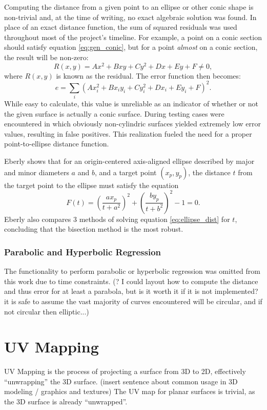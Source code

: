 Computing the distance from a given point to an ellipse or other conic shape is non-trivial and, at the time of writing, no exact algebraic solution was found.
In place of an exact distance function, the sum of squared residuals was used throughout most of the project's timeline.
For example, a point on a conic section should satisfy equation \ref{eq:gen_conic}, but for a point \textit{almost} on a conic section, the result will be non-zero:
\begin{equation}
	R(x,y) = Ax^2 + Bxy + Cy^2 + Dx + Ey + F \neq 0,
\end{equation}
where $R(x,y)$ is known as the residual. The error function then becomes:
\begin{equation}
	e = \sum_i \left(Ax_i^2 + Bx_i y_i + Cy_i^2 + Dx_i + Ey_i + F\right)^2.
\end{equation}
While easy to calculate, this value is unreliable as an indicator of whether or not the given surface is actually a conic surface.
During testing cases were encountered in which obviously non-cylindric surfaces yielded extremely low error values, resulting in false positives.
This realization fueled the need for a proper point-to-ellipse distance function.

Eberly\cite{GeoTools_pt_to_ellipse} shows that for an origin-centered axis-aligned ellipse described by major and minor diameters $a$ and $b$, and a target point $(x_p, y_p)$, the distance $t$ from the target point to the ellipse must satisfy the equation
\begin{equation}\label{eq:ellipse_dist}
	F(t) = \left(\frac{a x_p}{t + a^2}\right)^2 + \left(\frac{b y_p}{t + b^2}\right)^2 - 1 = 0.
\end{equation}
Eberly also compares 3 methods of solving equation \ref{eq:ellipse_dist} for $t$, concluding that the bisection method is the most robust.

\subsubsection{Parabolic and Hyperbolic Regression}
The functionality to perform parabolic or hyperbolic regression was omitted from this work due to time constraints.
(? I could layout how to compute the distance and thus error for at least a parabola, but is it worth it if it is not implemented? it is safe to assume the vast majority of curves encountered will be circular, and if not circular then elliptic...)

\section{UV Mapping}
UV Mapping is the process of projecting a surface from 3D to 2D, effectively ``unwrapping'' the 3D surface.
(insert sentence about common usage in 3D modeling / graphics and textures)
The UV map for planar surfaces is trivial, as the 3D surface is already ``unwrapped''.

